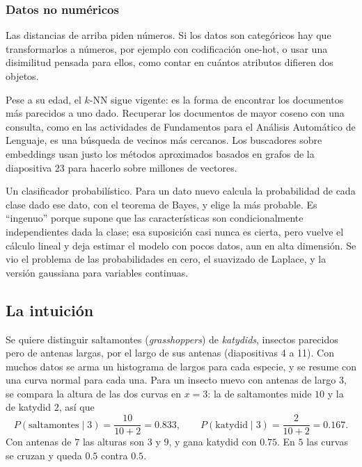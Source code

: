 \documentclass[11pt,letterpaper]{article}
\begin{document}
\subsubsection*{Datos no numéricos}

Las distancias de arriba piden números. Si los datos son categóricos
hay que transformarlos a números, por ejemplo con codificación one-hot,
o usar una disimilitud pensada para ellos, como contar en cuántos
atributos difieren dos objetos.

\begin{idea}
    Pese a su edad, el $k$-NN sigue vigente: es la forma de encontrar
    los documentos más parecidos a uno dado. Recuperar los documentos
    de mayor coseno con una consulta, como en las actividades de
    Fundamentos para el Análisis Automático de Lenguaje, es una
    búsqueda de vecinos más cercanos. Los buscadores sobre embeddings
    usan justo los métodos aproximados basados en grafos de la
    diapositiva 23 para hacerlo sobre millones de vectores.
\end{idea}

\newpage



\begin{quick_sum}
    Un clasificador probabilístico. Para un dato nuevo calcula la
    probabilidad de cada clase dado ese dato, con el teorema de
    Bayes, y elige la más probable. Es ``ingenuo'' porque supone que
    las características son condicionalmente independientes dada la
    clase; esa suposición casi nunca es cierta, pero vuelve el
    cálculo lineal y deja estimar el modelo con pocos datos, aun en
    alta dimensión. Se vio el problema de las probabilidades en cero,
    el suavizado de Laplace, y la versión gaussiana para variables
    continuas.
\end{quick_sum}

\subsection*{La intuición}

Se quiere distinguir saltamontes (\textit{grasshoppers}) de
\textit{katydids}, insectos parecidos pero de antenas largas, por el
largo de sus antenas (diapositivas 4 a 11). Con muchos datos
se arma un histograma de largos para cada especie, y se resume con
una curva normal para cada una. Para un insecto nuevo con antenas de
largo $3$, se compara la altura de las dos curvas en $x = 3$: la de
saltamontes mide $10$ y la de katydid $2$, así que
\[
    P(\text{saltamontes} \mid 3) = \frac{10}{10 + 2} = 0.833 ,
    \qquad
    P(\text{katydid} \mid 3) = \frac{2}{10 + 2} = 0.167 .
\]
Con antenas de $7$ las alturas son $3$ y $9$, y gana katydid con
$0.75$. En $5$ las curvas se cruzan y queda $0.5$ contra $0.5$.
\end{document}
